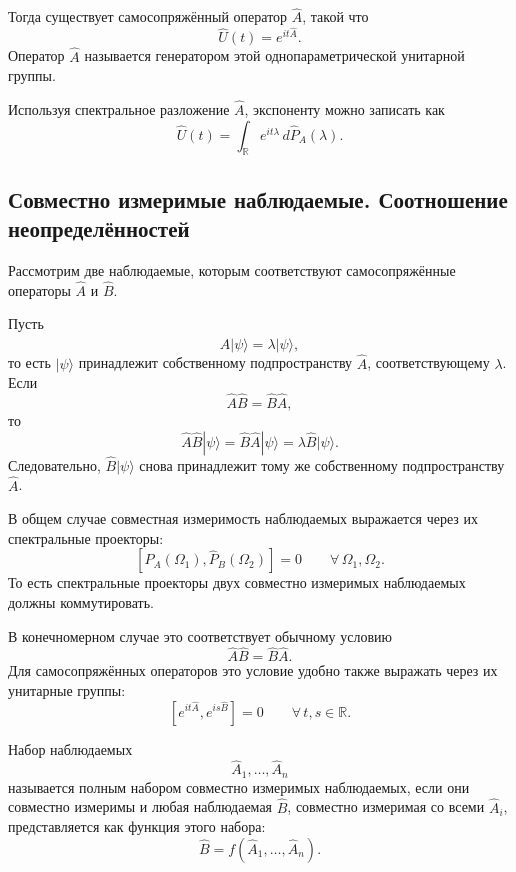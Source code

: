 \documentclass[12pt,a4paper]{article}
\begin{document}
Тогда существует самосопряжённый оператор $\hat A$, такой что
\[
    \boxed{
        \hat U(t)=e^{it\hat A}
    }.
\]
Оператор $\hat A$ называется генератором этой однопараметрической
унитарной группы.

Используя спектральное разложение $\hat A$, экспоненту можно записать
как
\[
    \boxed{
        \hat U(t)
        =
        \int_{\mathbb R}
            e^{it\lambda}\,
            d\hat P_A(\lambda)
    }.
\]


\subsection{Совместно измеримые наблюдаемые. Соотношение неопределённостей}

Рассмотрим две наблюдаемые, которым соответствуют самосопряжённые
операторы $\hat A$ и $\hat B$.

Пусть
\[
    \hat A|\psi\rangle
    =
    \lambda|\psi\rangle,
\]
то есть $|\psi\rangle$ принадлежит собственному подпространству
$\hat A$, соответствующему $\lambda$. Если
\[
    \hat A\hat B=\hat B\hat A,
\]
то
\[
    \hat A\hat B|\psi\rangle
    =
    \hat B\hat A|\psi\rangle
    =
    \lambda\hat B|\psi\rangle.
\]
Следовательно, $\hat B|\psi\rangle$ снова принадлежит тому же
собственному подпространству $\hat A$.

В общем случае совместная измеримость наблюдаемых выражается через
их спектральные проекторы:
\[
    \boxed{
        [\hat P_A(\Omega_1),\hat P_B(\Omega_2)]
        =
        0
        \qquad
        \forall\,\Omega_1,\Omega_2
    }.
\]
То есть спектральные проекторы двух совместно измеримых наблюдаемых
должны коммутировать.

В конечномерном случае это соответствует обычному условию
\[
    \boxed{
        \hat A\hat B=\hat B\hat A
    }.
\]
Для самосопряжённых операторов это условие удобно также выражать через
их унитарные группы:
\[
    \boxed{
        [e^{it\hat A},e^{is\hat B}]=0
        \qquad
        \forall\,t,s\in\mathbb R
    }.
\]

Набор наблюдаемых
\[
    \hat A_1,\ldots,\hat A_n
\]
называется полным набором совместно измеримых наблюдаемых, если они
совместно измеримы и любая наблюдаемая $\hat B$, совместно измеримая
со всеми $\hat A_i$, представляется как функция этого набора:
\[
    \boxed{
        \hat B
        =
        f(\hat A_1,\ldots,\hat A_n)
    }.
\]
\end{document}
